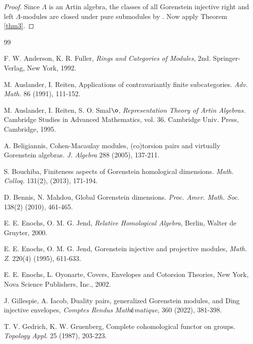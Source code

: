 \documentclass[11pt,a4paper]{article}
\begin{document}
 \begin{proof} Since $\Lambda$ is an Artin algebra, the   classes of all Gorenstein     injective
   right and left  $\Lambda$-modules   are closed under pure submodules by \cite[Proposition 3.8(iii)]{bel}. Now apply Theorem \ref{thm3}.
 \end{proof}


\medskip




   \vskip3mm

\begin{thebibliography}{99}

 F. W. Anderson,  K. R. Fuller,  {\it Rings and
Categories  of  Modules}, 2nd. Springer-Verlag, New York, 1992.

  M. Auslander, I. Reiten, Applications of contravariantly finite subcategories. {\it Adv. Math.} 86 (1991), 111-152.

 M. Auslander, I. Reiten, S. O. Smal${\o}$, {\it Representation Theory of Artin Algebras.} Cambridge Studies in Advanced Mathematics, vol. 36. Cambridge Univ.  Press, Cambridge, 1995.

 A. Beligiannis, Cohen-Macaulay modules, (co)torsion pairs and virtually Gorenstein algebras. {\it J. Algebra }  288 (2005), 137-211.

 S. Bouchiba,   Finiteness aspects of Gorenstein homological dimensions. {\it Math. Colloq.} 131(2),  (2013), 171-194.  

 D. Bennis, N. Mahdou, Global Gorenstein dimensions. {\it Proc.
Amer.  Math.  Soc}.  138(2) (2010), 461-465.

 E. E. Enochs, O. M. G. Jend, {\it Relative  Homological  Algebra},  Berlin,  Walter de Gruyter,
2000.

  E. E. Enochs, O. M. G. Jend, Gorenstein injective and projective modules,  {\it Math. Z}. 220(4)  (1995), 611-633. 

 E. E. Enochs, L. Oyonarte, Covers, Envelopes and Cotorsion Theories, New York,
Nova Science Publishers, Inc., 2002.

  J. Gillespie, A. Iacob, Duality pairs, generalized Gorenstein modules, and Ding injective
envelopes, {\it Comptes Rendus Math$\acute{{\rm e}}$matique},  360 (2022), 381-398. 

 T. V. Gedrich,  K. W. Gruenberg,  Complete cohomological functor on groups.
{\it Topology Appl.} 25 (1987), 203-223.  


\end{thebibliography}
\end{document}
